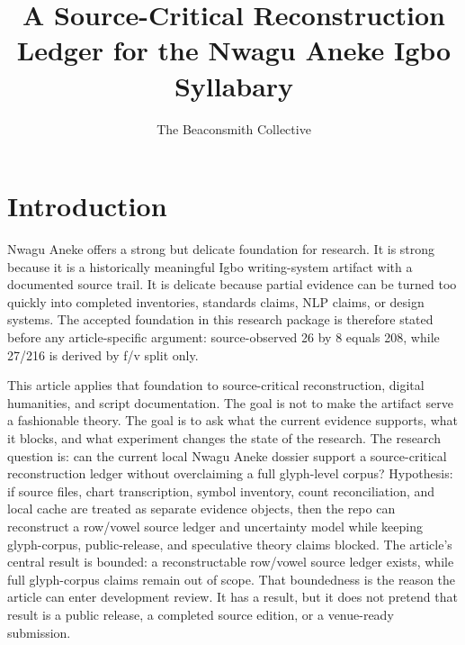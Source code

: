 \documentclass[sigconf,nonacm]{acmart}
\title{A Source-Critical Reconstruction Ledger for the Nwagu Aneke Igbo Syllabary}
\author{The Beaconsmith Collective}
\affiliation{\institution{Etisiobi Research Studio}\city{Enugu}\country{Nigeria}}
\begin{document}
\maketitle

\section{Introduction}
Nwagu Aneke offers a strong but delicate foundation for research. It is strong
because it is a historically meaningful Igbo writing-system artifact with a
documented source trail. It is delicate because partial evidence can be turned
too quickly into completed inventories, standards claims, NLP claims, or design
systems. The accepted foundation in this research package is therefore stated
before any article-specific argument: source-observed 26 by 8 equals 208, while
27/216 is derived by f/v split only.

This article applies that foundation to source-critical reconstruction, digital humanities, and script documentation. The goal is not to make the
artifact serve a fashionable theory. The goal is to ask what the current
evidence supports, what it blocks, and what experiment changes the state of the
research. The research question is: can the current local Nwagu Aneke dossier
support a source-critical reconstruction ledger without overclaiming a full glyph-level corpus? Hypothesis: if source files, chart transcription, symbol
inventory, count reconciliation, and local cache are treated as separate evidence
objects, then the repo can reconstruct a row/vowel source ledger and uncertainty
model while keeping glyph-corpus, public-release, and speculative theory claims
blocked. The article's central result is bounded: a reconstructable row/vowel source ledger exists, while full glyph-corpus claims remain out of scope. That boundedness is
the reason the article can enter development review. It has a result, but it
does not pretend that result is a public release, a completed source edition, or
a venue-ready submission.
\end{document}
